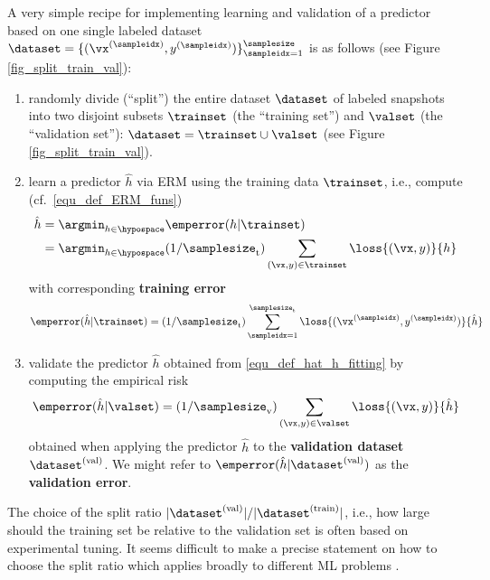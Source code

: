 \documentclass[12pt]{report}
\begin{document}
A very simple recipe for implementing learning and validation of a 
predictor based on one single labeled dataset $\dataset = \{(\vx^{(\sampleidx)},y^{(\sampleidx)})\}_{\sampleidx=1}^{\samplesize}$ is as follows (see Figure \ref{fig_split_train_val}): 
\begin{enumerate} 
\item randomly divide (``split'') the entire dataset $\dataset$ of labeled snapshots into two disjoint subsets 
$\trainset$ (the ``training set'') and $\valset$ (the ``validation set''): 
$\dataset = \trainset \cup \valset$ (see Figure \ref{fig_split_train_val}). 
\item learn a predictor $\hat{h}$ via ERM using the training data $\trainset$, i.e., compute (cf.\ \eqref{equ_def_ERM_funs}) 
\begin{align} 
\label{equ_def_hat_h_fitting}
\hat{h} & = \argmin_{h \in \hypospace} \emperror(h| \trainset) \nonumber \\
& = \argmin_{h \in \hypospace}  (1/\samplesize_{\rm t}) \sum_{(\vx,y) \in \trainset} \loss{(\vx,y)}{h} %
\end{align} 
with corresponding {\bf training error} 
\begin{equation} 
\label{equ_def_training_error_val}
\emperror(\hat{h}|\trainset)=  (1/\samplesize_{\rm t}) \sum_{\sampleidx=1}^{\samplesize_{\rm t}} \loss{(\vx^{(\sampleidx)},y^{(\sampleidx)})} {\hat{h}}  %
\end{equation}  
\item validate the predictor $\hat{h}$ obtained from \eqref{equ_def_hat_h_fitting} by computing the empirical risk 
\begin{equation} 
\label{equ_def_training_val_val}
\emperror(\hat{h}|\valset) = (1/\samplesize_{\rm v})  \sum_{(\vx,y) \in \valset} \loss{(\vx,y)} {\hat{h}}  %
\end{equation}  
obtained when applying the predictor $\hat{h}$ to the {\bf validation dataset} $\dataset^{(\rm val)}$. 
We might refer to $\emperror(\hat{h}| \dataset^{(\rm val)})$ as the {\bf validation error}. 
\end{enumerate} 
The choice of the split ratio $|\dataset^{(\rm val)}| / |\dataset^{(\rm train)}|$, i.e., how 
large should the training set be relative to the validation set is often based on experimental 
tuning. It seems difficult to make a precise statement on how to choose the split ratio 
which applies broadly to different ML problems \cite{Larsen1999}.
 
\end{document}

